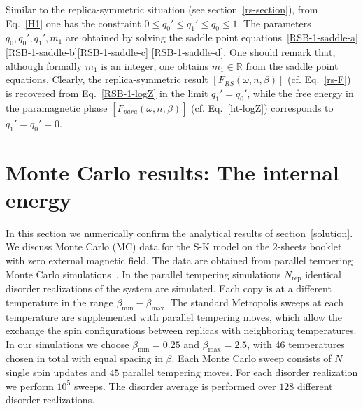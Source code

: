 \documentclass[twocolumn,superscriptaddress,prb,10pt]{revtex4-1}
\begin{document}
%
Similar to the replica-symmetric situation (see section~\ref{rs-section}), 
from Eq.~\eqref{H1} one has the constraint $0\le q_0'\le q_1'\le q_0\le 1$.
The parameters $q_0,q_0',q_1',m_1$ are obtained by solving the saddle 
point equations~\eqref{RSB-1-saddle-a}\eqref{RSB-1-saddle-b}\eqref{RSB-1-saddle-c}
\eqref{RSB-1-saddle-d}. One should remark that, although formally $m_1$ is an 
integer, one obtains $m_1\in\mathbb{R}$ from the saddle point equations. 
Clearly, the replica-symmetric result $[F_{RS}(\omega,n,\beta)]$ (cf. 
Eq.~\eqref{rs-F}) is recovered from Eq.~\eqref{RSB-1-logZ} in the limit 
$q_1'=q_0'$, while the free energy in the paramagnetic phase $[F_{para}(\omega,n,
\beta)]$ (cf. Eq.~\eqref{ht-logZ}) corresponds to $q_1'=q_0'=0$.

\section{Monte Carlo results: The internal energy}
\label{mc-results}

In this section we numerically confirm the analytical results of section~\ref{solution}. 
We discuss Monte Carlo (MC) data for the S-K model on the $2$-sheets booklet 
with zero external magnetic field. The data are obtained from parallel tempering  
Monte Carlo simulations~\cite{hukushima-1996}. In the parallel tempering simulations 
$N_{\textrm{rep}}$ identical disorder realizations of the system are simulated. Each copy is at 
a different temperature in the range $\beta_{\textrm{min}}-\beta_{\textrm{max}}$. 
The standard Metropolis sweeps at 
each temperature are supplemented with parallel tempering moves, which allow 
the exchange the spin configurations between replicas with neighboring temperatures. 
In our simulations we choose $\beta_{\textrm{min}}=0.25$ and $\beta_{\textrm{max}}=2.5$, with 46 temperatures
chosen in total with equal spacing in $\beta$.
Each Monte Carlo sweep consists of $N$ single spin updates and $45$ parallel 
tempering moves. For each disorder realization we perform $10^5$ sweeps. 
The disorder average is performed over $128$ different disorder realizations.  
\end{document}
